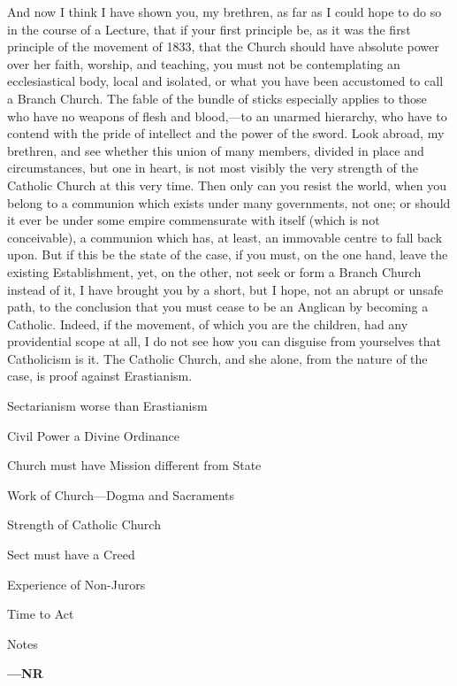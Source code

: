 And now I think I have shown you, my brethren, as far as I could
hope to do so in the course of a Lecture, that if your first principle
be, as it was the first principle of the movement of 1833, that the
Church should have absolute power over her faith, worship, and
teaching, you must not be contemplating an ecclesiastical body, local
and isolated, or what you have been accustomed to call a Branch
Church. The fable of the bundle of sticks especially applies to those
who have no weapons of flesh and blood,—to an unarmed hierarchy, who
have to contend with the pride of intellect and the power of the
sword. Look abroad, my brethren, and see whether this union of many
members, divided in place and circumstances, but one in heart, is not
most visibly the very strength of the Catholic Church at this very
time. Then only can you resist the world, when you belong to a
communion which exists under many governments, not one; or should it
ever be under some empire commensurate with itself (which is not
conceivable), a communion which has, at least, an immovable centre to
fall back upon. But if this be the state of the case, if you must, on
the one hand, leave the existing Establishment, yet, on the other, not
seek or form a Branch Church instead of it, I have brought you by a
short, but I hope, not an abrupt or unsafe path, to the conclusion
that you must cease to be an Anglican by becoming a Catholic. Indeed,
if the movement, of which you are the children, had any providential
scope at all, I do not see how you can disguise from yourselves that
Catholicism is it. The Catholic Church, and she alone, from the nature
of the case, is proof against Erastianism.


Sectarianism worse than Erastianism

Civil Power a Divine Ordinance

Church must have Mission different from State

Work of Church—Dogma and Sacraments

Strength of Catholic Church

Sect must have a Creed

Experience of Non-Jurors

Time to Act

Notes

\textbf{—NR}

